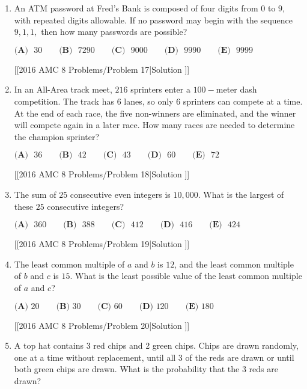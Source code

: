 \documentclass{article}
\begin{document}
\begin{enumerate}[label=\arabic*., itemsep=0.5em]
[[2016 AMC 8 Problems/Problem 16|Solution
]]\par \vspace{0.5em}\item An ATM password at Fred's Bank is composed of four digits from \(0\) to \(9\), with repeated digits allowable. If no password may begin with the sequence \(9,1,1,\) then how many passwords are possible?

\(\textbf{(A)}\mbox{ }30\qquad\textbf{(B)}\mbox{ }7290\qquad\textbf{(C)}\mbox{ }9000\qquad\textbf{(D)}\mbox{ }9990\qquad\textbf{(E)}\mbox{ }9999\)

[[2016 AMC 8 Problems/Problem 17|Solution
]]\par \vspace{0.5em}\item In an All-Area track meet, \(216\) sprinters enter a \(100-\)meter dash competition. The track has \(6\) lanes, so only \(6\) sprinters can compete at a time. At the end of each race, the five non-winners are eliminated, and the winner will compete again in a later race. How many races are needed to determine the champion sprinter?

\(\textbf{(A)}\mbox{ }36\qquad\textbf{(B)}\mbox{ }42\qquad\textbf{(C)}\mbox{ }43\qquad\textbf{(D)}\mbox{ }60\qquad\textbf{(E)}\mbox{ }72\)

[[2016 AMC 8 Problems/Problem 18|Solution
]]\par \vspace{0.5em}\item The sum of \(25\) consecutive even integers is \(10,000\). What is the largest of these \(25\) consecutive integers?

\(\textbf{(A)}\mbox{ }360\qquad\textbf{(B)}\mbox{ }388\qquad\textbf{(C)}\mbox{ }412\qquad\textbf{(D)}\mbox{ }416\qquad\textbf{(E)}\mbox{ }424\)

[[2016 AMC 8 Problems/Problem 19|Solution
]]\par \vspace{0.5em}\item The least common multiple of \(a\) and \(b\) is \(12\), and the least common multiple of \(b\) and \(c\) is \(15\). What is the least possible value of the least common multiple of \(a\) and \(c\)?

\(\textbf{(A) }20\qquad\textbf{(B) }30\qquad\textbf{(C) }60\qquad\textbf{(D) }120\qquad \textbf{(E) }180\)

[[2016 AMC 8 Problems/Problem 20|Solution
]]\par \vspace{0.5em}\item A top hat contains 3 red chips and 2 green chips. Chips are drawn randomly, one at a time without replacement, until all 3 of the reds are drawn or until both green chips are drawn. What is the probability that the 3 reds are drawn?


\end{enumerate}
\end{document}
